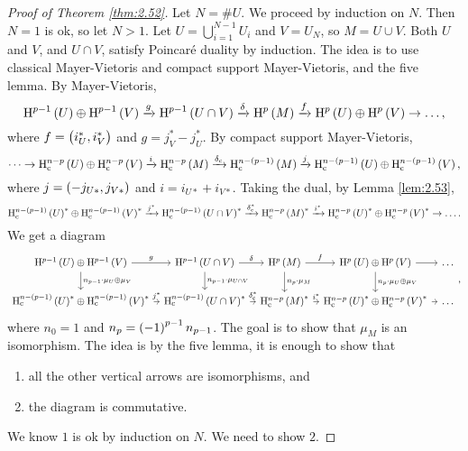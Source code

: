 \begin{proof}[Proof of Theorem \ref{thm:2.52}]
Let $ N = \#U $. We proceed by induction on $ N $. Then $ N = 1 $ is ok, so let $ N > 1 $. Let $ U = \bigcup_{i = 1}^{N - 1} U_i $ and $ V = U_N $, so $ M = U \cup V $. Both $ U $ and $ V $, and $ U \cap V $, satisfy Poincar\'e duality by induction. The idea is to use classical Mayer-Vietoris and compact support Mayer-Vietoris, and the five lemma. By Mayer-Vietoris,
$$ \H^{p - 1}\br{U} \oplus \H^{p - 1}\br{V} \xrightarrow{g} \H^{p - 1}\br{U \cap V} \xrightarrow{\delta} \H^p\br{M} \xrightarrow{f} \H^p\br{U} \oplus \H^p\br{V} \to \dots, $$
where $ f = \br{i_U^*, i_V^*} $ and $ g = j_V^* - j_U^* $. By compact support Mayer-Vietoris,
$$ \dots \to \H_\c^{n - p}\br{U} \oplus \H_\c^{n - p}\br{V} \xrightarrow{i} \H_\c^{n - p}\br{M} \xrightarrow{\delta_\c} \H_\c^{n - \br{p - 1}}\br{M} \xrightarrow{j} \H_\c^{n - \br{p - 1}}\br{U} \oplus \H_\c^{n - \br{p - 1}}\br{V}, $$
where $ j = \br{-j_{U*}, j_{V*}} $ and $ i = i_{U*} + i_{V*} $. Taking the dual, by Lemma \ref{lem:2.53},
$$ \H_\c^{n - \br{p - 1}}\br{U}^* \oplus \H_\c^{n - \br{p - 1}}\br{V}^* \xrightarrow{j^*} \H_\c^{n - \br{p - 1}}\br{U \cap V}^* \xrightarrow{\delta_\c^*} \H_\c^{n - p}\br{M}^* \xrightarrow{i^*} \H_\c^{n - p}\br{U}^* \oplus \H_\c^{n - p}\br{V}^* \to \dots. $$
We get a diagram
$$
\begin{tikzcd}[column sep=tiny]
\H^{p - 1}\br{U} \oplus \H^{p - 1}\br{V} \arrow{r}{g} \arrow{d}{n_{p - 1} \cdot \mu_U \oplus \mu_V} & \H^{p - 1}\br{U \cap V} \arrow{r}{\delta} \arrow{d}{n_{p - 1} \cdot \mu_{U \cap V}} & \H^p\br{M} \arrow{r}{f} \arrow{d}{n_p \cdot \mu_M} & \H^p\br{U} \oplus \H^p\br{V} \arrow{r} \arrow{d}{n_p \cdot \mu_U \oplus \mu_V} & \dots \\
\H_\c^{n - \br{p - 1}}\br{U}^* \oplus \H_\c^{n - \br{p - 1}}\br{V}^* \arrow{r}{j^*} & \H_\c^{n - \br{p - 1}}\br{U \cap V}^* \arrow{r}{\delta_\c^*} & \H_\c^{n - p}\br{M}^* \arrow{r}{i^*} & \H_\c^{n - p}\br{U}^* \oplus \H_\c^{n - p}\br{V}^* \arrow{r} & \dots
\end{tikzcd},
$$
where $ n_0 = 1 $ and $ n_p = \br{-1}^{p - 1}n_{p - 1} $. The goal is to show that $ \mu_M $ is an isomorphism. The idea is by the five lemma, it is enough to show that
\begin{enumerate}
\item all the other vertical arrows are isomorphisms, and
\item the diagram is commutative.
\end{enumerate}
We know $ 1 $ is ok by induction on $ N $. We need to show $ 2 $.

\end{proof}
